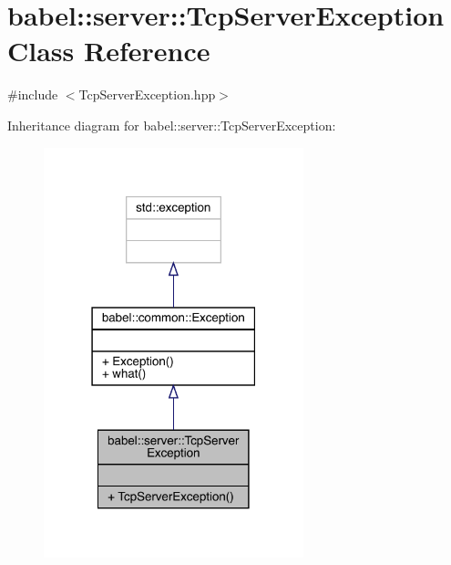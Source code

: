 \hypertarget{classbabel_1_1server_1_1_tcp_server_exception}{}\section{babel\+:\+:server\+:\+:Tcp\+Server\+Exception Class Reference}
\label{classbabel_1_1server_1_1_tcp_server_exception}


{\ttfamily \#include $<$Tcp\+Server\+Exception.\+hpp$>$}



Inheritance diagram for babel\+:\+:server\+:\+:Tcp\+Server\+Exception\+:\nopagebreak
\begin{figure}[H]
\begin{center}
\leavevmode
\includegraphics[width=214pt]{classbabel_1_1server_1_1_tcp_server_exception__inherit__graph}
\end{center}
\end{figure}


